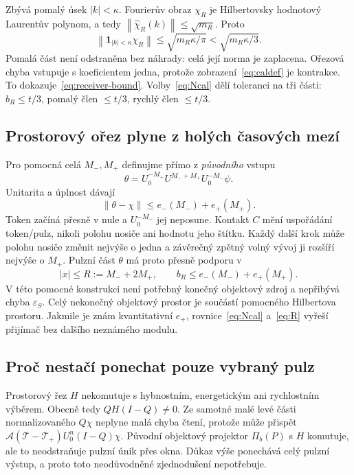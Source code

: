 \documentclass[11pt,a4paper]{article}
\newcommand{\norm}[1]{\left\lVert#1\right\rVert}
\newcommand{\ind}{\mathbf1}
\newcommand{\Tcal}{\mathcal T}
\newcommand{\eps}{\varepsilon}
\theoremstyle{remark}\newtheorem{remark}[theorem]{Poznámka}
\numberwithin{equation}{section}
\begin{document}
Zbývá pomalý úsek \(|k|<\kappa\). Fourierův obraz \(\chi_R\) je Hilbertovsky hodnotový Laurentův polynom, a tedy \(\norm{\widehat\chi_R(k)}\le\sqrt{m_R}\). Proto
\[
\norm{\ind_{|k|<\kappa}\chi_R}
\le\sqrt{m_R\kappa/\pi}<\sqrt{m_R\kappa/3}.
\]
Pomalá část není odstraněna bez náhrady: celá její norma je zaplacena. Ořezová chyba vstupuje s koeficientem jedna, protože zobrazení~\eqref{eq:caldef} je kontrakce. To dokazuje~\eqref{eq:receiver-bound}. Volby~\eqref{eq:Ncal} dělí toleranci na tři části: \(b_R\le t/3\), pomalý člen \(\le t/3\), rychlý člen \(\le t/3\).

\subsection{Prostorový ořez plyne z holých časových mezí}

Pro pomocná celá \(M_-,M_+\) definujme přímo z \emph{původního} vstupu
\begin{equation}
\theta=U_0^{-M_+}U^{M_-+M_+}U_0^{-M_-}\psi.
\label{eq:theta}
\end{equation}
Unitarita a úplnost dávají
\begin{equation}
\norm{\theta-\chi}\le e_-(M_-)+e_+(M_+).
\label{eq:theta-error}
\end{equation}
Token začíná přesně v nule a \(U_0^{-M_-}\) jej neposune. Kontakt \(C\) mění uspořádání token/pulz, nikoli polohu nosiče ani hodnotu jeho štítku. Každý další krok může polohu nosiče změnit nejvýše o jedna a závěrečný zpětný volný vývoj ji rozšíří nejvýše o \(M_+\). Pulzní část \(\theta\) má proto přesně podporu v
\begin{equation}
|x|\le R:=M_-+2M_+,
\qquad b_R\le e_-(M_-)+e_+(M_+).
\label{eq:R}
\end{equation}
V této pomocné konstrukci není potřebný konečný objektový zdroj a nepřibývá chyba \(\eps_S\). Celý nekonečný objektový prostor je součástí pomocného Hilbertova prostoru. Jakmile je znám kvantitativní \(e_+\), rovnice~\eqref{eq:Ncal} a~\eqref{eq:R} vyřeší přijímač bez dalšího neznámého modulu.

\subsection{Proč nestačí ponechat pouze vybraný pulz}

Prostorový řez \(H\) nekomutuje s hybnostním, energetickým ani rychlostním výběrem. Obecně tedy \(QH(I-Q)\ne0\). Ze samotné malé levé části normalizovaného \(Q\chi\) neplyne malá chyba čtení, protože může přispět
\(\mathcal A(\Tcal-\Tcal_+)U_0^n(I-Q)\chi\).
Původní objektový projektor \(\Pi_b(P)\) s \(H\) komutuje, ale to neodstraňuje pulzní únik přes okna. Důkaz výše ponechává celý pulzní výstup, a proto toto neodůvodněné zjednodušení nepotřebuje.
\end{document}
